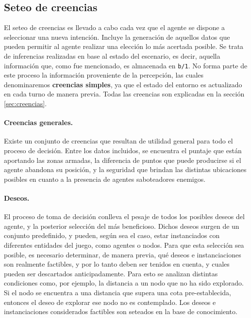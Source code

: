 \documentclass[oneside]{book}
\theoremstyle{definition}
\begin{document}
\subsection{Seteo de creencias}

\label{sec:seteoCreencias}

El seteo de creencias es llevado a cabo cada vez que el agente se dispone a 
seleccionar una nueva intención. Incluye la generación de aquellos datos que pueden 
permitir al agente realizar una elección lo más acertada posible. Se trata de 
inferencias realizadas en base al estado del escenario, es decir, aquella información 
que, como fue mencionado, es almacenada en \texttt{b/1}. No forma parte de este proceso 
la información proveniente de la percepción, las cuales denominaremos \textbf{creencias
simples}, ya que el estado del entorno es actualizado 
en cada turno de manera previa. Todas las creencias son explicadas en 
la sección \ref{sec:creencias}.

\paragraph{Creencias generales.}

Existe un conjunto de creencias que resultan de utilidad general para todo el proceso 
de decisión. Entre los datos incluidos, se encuentra el puntaje que están 
aportando las zonas armadas, la diferencia de puntos que puede producirse si el agente 
abandona su posición, y la seguridad que brindan las distintas ubicaciones posibles en 
cuanto a la presencia de agentes saboteadores enemigos. 

\paragraph{Deseos.}

El proceso de toma de decisión conlleva el 
pesaje de todos los posibles deseos del agente, y la posterior selección del más beneficioso. 
Dichos deseos surgen de un conjunto predefinido, y pueden, según sea el caso, estar 
instanciados con diferentes entidades del juego, como agentes o nodos. Para que esta 
selección sea posible, es necesario determinar, de manera previa, qué deseos e instanciaciones 
son realmente factibles, y por lo tanto deben ser tenidos en cuenta, y cuales pueden ser 
descartados anticipadamente.
Para esto se analizan distintas condiciones como, por ejemplo, la distancia a un nodo 
que no ha sido explorado. Si el nodo se encuentra a una distancia que supera una cota 
pre-establecida, entonces el deseo de explorar ese nodo no es contemplado.
Los deseos e instanciaciones considerados factibles son seteados en la base de conocimiento.
\end{document}

